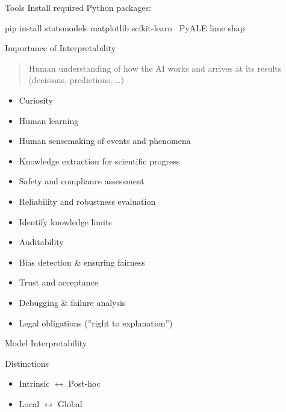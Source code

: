 \documentclass[ignorenonframetext,xcolor=x11names]{beamer}
\begin{document}
\begin{frame}[fragile]{Tools}
Install required Python packages:
\begin{bashcode}
pip install statsmodels matplotlib scikit-learn \
    PyALE lime shap
\end{bashcode}
\end{frame}


\begin{frame}{Importance of Interpretability}

\begin{quote} \large
Human understanding of how the AI works and arrives at its results (decisions, predictions, \ldots)
\end{quote}

\footnotesize
\begin{itemize}
\item Curiosity
\item Human learning
\item Human sensemaking of events and phenomena
\item Knowledge extraction for scientific progress
\item Safety and compliance assessment
\item Reliability and robustness evaluation
\item Identify knowledge limits
\item Auditability
\item Bias detection \& ensuring fairness
\item Trust and acceptance
\item Debugging \& failure analysis
\item Legal obligations (''right to explanation'')
\end{itemize}
\end{frame}

\begin{frame}{Model Interpretability}
\begin{block}{Distinctions}
\begin{itemize}
   \item Intrinsic $\leftrightarrow$ Post-hoc
   \item Local $\leftrightarrow$ Global
\end{itemize}
\end{block}
\end{frame}
\end{document}
